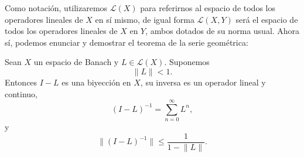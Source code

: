 Como notación, utilizaremos $\mathcal{L}(X)$ para referirnos al espacio de todos los operadores lineales de $X$ en sí mismo, de igual forma $\mathcal{L}(X,Y)$ será el espacio de todos los operadores lineales de $X$ en $Y$, ambos dotados de su norma usual. Ahora sí, podemos enunciar y demostrar el teorema de la serie geométrica:
\begin{teorema}\label{teorema}
	Sean $X$ un espacio de Banach y $L \in \mathcal{L}(X)$. Suponemos
	\begin{equation}
		\lVert L \rVert < 1.
	\end{equation}
	Entonces $I - L$ es una biyección en $X$, su inversa es un operador lineal y continuo,
	\begin{equation}
		(I-L)^{-1} = \sum_{n=0}^{\infty}L^n,
	\end{equation}
	y
	\begin{equation}\label{eq:teo1}
		\lVert (I-L)^{-1} \rVert \leqslant \dfrac{1}{1 - \lVert L \rVert}.
	\end{equation}
\end{teorema}
